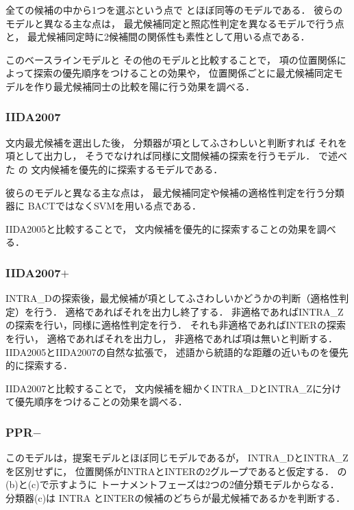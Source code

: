 \documentclass[japanese]{jnlp_1.4}
\newcommand{\figref}[1]{}
\newcommand{\secref}[1]{}
\begin{document}
全ての候補の中から1つを選ぶという点で
\cite{Imamura:2009:ACL}とほぼ同等のモデルである．
彼らのモデルと異なる主な点は，
最尤候補同定と照応性判定を異なるモデルで行う点と，
最尤候補同定時に2候補間の関係性も素性として用いる点である．

このベースラインモデルと
その他のモデルと比較することで，
項の位置関係によって探索の優先順序をつけることの効果や，
位置関係ごとに最尤候補同定モデルを作り最尤候補同士の比較を陽に行う効果を調べる．


\subsubsection{IIDA2007} 

文内最尤候補を選出した後，
分類器が項としてふさわしいと判断すれば
それを項として出力し，
そうでなければ同様に文間候補の探索を行うモデル．
\secref{iida-bact}で述べた
\cite{Iida:2007:TALIP}の
文内候補を優先的に探索するモデルである．

彼らのモデルと異なる主な点は，
最尤候補同定や候補の適格性判定を行う分類器に
BACTではなくSVMを用いる点である．



IIDA2005と比較することで，
文内候補を優先的に探索することの効果を調べる．

\subsubsection{IIDA2007$+$} 

INTRA\_Dの探索後，最尤候補が項としてふさわしいかどうかの判断（適格性判定）を行う．
適格であればそれを出力し終了する．
非適格であればINTRA\_Zの探索を行い，同様に適格性判定を行う．
それも非適格であればINTERの探索を行い，
適格であればそれを出力し，
非適格であれば項は無いと判断する．
IIDA2005とIIDA2007の自然な拡張で，
述語から統語的な距離の近いものを優先的に探索する．


IIDA2007と比較することで，
文内候補を細かくINTRA\_DとINTRA\_Zに分けて優先順序をつけることの効果を調べる．


\subsubsection{PPR$-$}

このモデルは，提案モデルとほぼ同じモデルであるが，
INTRA\_DとINTRA\_Zを区別せずに，
位置関係がINTRAとINTERの2グループであると仮定する．
\figref{fig:anap-tournament-model}の(b)と(c)で示すように
トーナメントフェーズは2つの2値分類モデルからなる．
分類器(c)は
INTRA とINTERの候補のどちらが最尤候補であるかを判断する．
\end{document}
